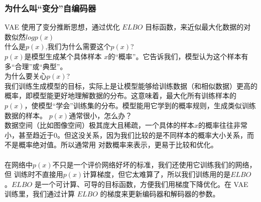 \documentclass[final]{ws-ijseke}
\begin{document}
\subsubsection{为什么叫“变分”自编码器}
\hspace*{2em} VAE 使用了变分推断思想，通过优化 $ELBO$ 目标函数，来近似最大化数据的对数似然$logp(x)$\\
什么是$p(x)$,我们为什么需要这个$p(x)$?\\
\hspace*{2em} $p(x)$是模型生成某个具体样本 $x$的“概率”。它告诉我们，模型认为这个样本有多“合理”或“典型”。\\
为什么要关心$p(x)$?\\
\hspace*{2em} 我们训练生成模型的目标，实际上是让模型能够给训练数据（和相似数据）更高的概率，即模型能更好地理解数据的分布。这意味着，最大化所有训练样本的 $p(x)$，使模型“学会”训练集的分布。模型能用它学到的概率规则，生成类似训练数据的样本。
$p(x)$通常很小，怎么办？\\
\hspace*{2em} 数据空间（比如图像空间）极其庞大且稀疏，一个具体的样本$x$的概率往往非常小，甚至趋近于0。但这没关系，因为我们比较的是不同样本的概率大小关系，而不是概率绝对值。所以通常用 对数概率来表示，更易于比较和优化。\\\\
\hspace*{2em} 在网络中$p(x)$不只是一个评价网络好坏的标准，我们还使用它训练我们的网络，但
训练时不直接用$p(x)$计算梯度，但它太难算了，所以我们训练用的是$ELBO$。$ELBO$ 是一个可计算、可导的目标函数，方便我们用梯度下降优化。在 VAE 训练里，我们通过计算 $ELBO$ 的梯度来更新编码器和解码器的参数。
\end{document}
